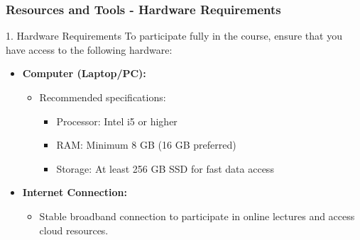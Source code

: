 \documentclass[aspectratio=169]{beamer}
\begin{document}
\begin{frame}[fragile]
    \frametitle{Resources and Tools - Hardware Requirements}
    \begin{block}{1. Hardware Requirements}
        To participate fully in the course, ensure that you have access to the following hardware:
    \end{block}
    \begin{itemize}
        \item \textbf{Computer (Laptop/PC):}
        \begin{itemize}
            \item Recommended specifications:
            \begin{itemize}
                \item Processor: Intel i5 or higher
                \item RAM: Minimum 8 GB (16 GB preferred)
                \item Storage: At least 256 GB SSD for fast data access
            \end{itemize}
        \end{itemize}
        \item \textbf{Internet Connection:}
        \begin{itemize}
            \item Stable broadband connection to participate in online lectures and access cloud resources.
        \end{itemize}
    \end{itemize}
\end{frame}
\end{document}
